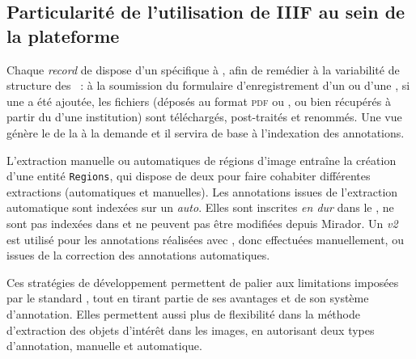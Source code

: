 \hypertarget{particularite-de-utilisation-de-iiif-au-sein-de-la-plateforme}{%
\subsection{Particularité de l'utilisation de IIIF au sein de la
plateforme}\label{particularite-de-utilisation-de-iiif-au-sein-de-la-plateforme}}

Chaque \textit{record} de \digit dispose d'un \man \iiif spécifique à \eida,
afin de remédier à la variabilité de structure des \mans~: à
la soumission du formulaire d'enregistrement d'un \wit ou d'une \ser, si une \digit a été
ajoutée, les fichiers (déposés au format \textsc{pdf} ou \jpeg, ou bien récupérés à
partir du \man d'une institution) sont téléchargés,
post-traités et renommés. Une vue génère le \man de la
\digit à la demande et il servira de base à l'indexation des
annotations.

L'extraction manuelle ou automatiques de régions d'image entraîne la
création d'une entité \texttt{Regions}, qui dispose de deux \mans pour
faire cohabiter différentes extractions (automatiques et manuelles). Les
annotations issues de l'extraction automatique sont indexées sur un
\man \textit{auto}. Elles sont inscrites \textit{en dur} dans le
\man, ne sont pas indexées dans \sas et ne peuvent pas être
modifiées depuis Mirador. Un \man \textit{v2} est utilisé pour les
annotations réalisées avec \sas, donc effectuées manuellement, ou issues
de la correction des annotations automatiques.

Ces stratégies de développement permettent de palier aux limitations
imposées par le standard \iiif, tout en tirant partie de ses avantages et
de son système d'annotation. Elles permettent aussi plus de flexibilité
dans la méthode d'extraction des objets d'intérêt dans les images, en
autorisant deux types d'annotation, manuelle et automatique.